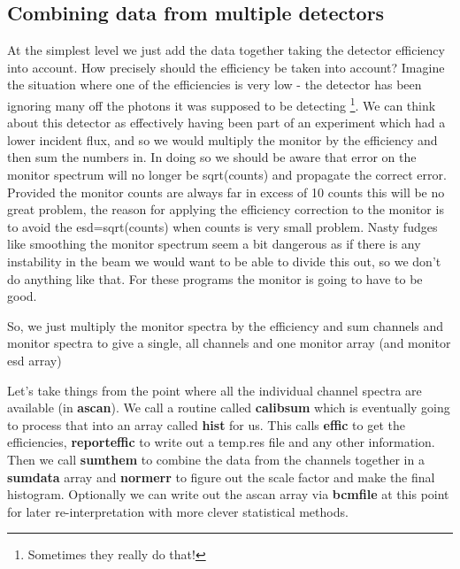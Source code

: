 \documentclass[10pt,a4paper,notitlepage]{article}
\newcommand{\var}[1]{\textbf{\textsf{#1}}} %
\newcommand{\code}[1]{\textbf{\textsf{#1}}} %
\begin{document}
\subsection{Combining data from multiple detectors}
At the simplest level we just add the data together taking the detector 
efficiency into account. 
How precisely should the efficiency be taken into account? 
Imagine the situation where one of the efficiencies is very low - the detector
has been ignoring many off the photons it was supposed to be detecting
\footnote{Sometimes they really do that!}. 
We can think about this detector as effectively having been part of an 
experiment which had a lower incident flux, and so we would multiply the 
monitor by the efficiency and then sum the numbers in. 
In doing so we should be aware that error on the monitor spectrum
will no longer be sqrt(counts) and propagate the correct error.
Provided the monitor counts are always far in excess of 10  counts 
this will be no great problem, the reason for applying the efficiency
correction to the monitor is to avoid the esd=sqrt(counts) when
counts is very small problem.
Nasty fudges like smoothing the monitor spectrum seem a bit dangerous as if 
there is any instability in the beam we would want to be able to divide this 
out, so we don't do anything like that. 
For these programs the monitor is going to have to be good.

So, we just multiply the monitor spectra by the efficiency and sum 
channels and monitor spectra to give a single, all channels and one 
monitor array (and monitor esd array)

Let's take things from the point where all the individual channel spectra 
are available (in \var{ascan}).
We call a routine called \code{calibsum} which is eventually going to 
process that into an array called \var{hist} for us.
This calls \code{effic} to get the efficiencies, \code{reporteffic}
to write out a temp.res file and any other information.
Then we call \code{sumthem} to combine the data from the channels together
in a \var{sumdata} array
and \code{normerr} to figure out the scale factor and make the final histogram.
Optionally we can write out the ascan array via \code{bcmfile} 
at this point for later 
re-interpretation with more clever statistical methods.
\end{document}
